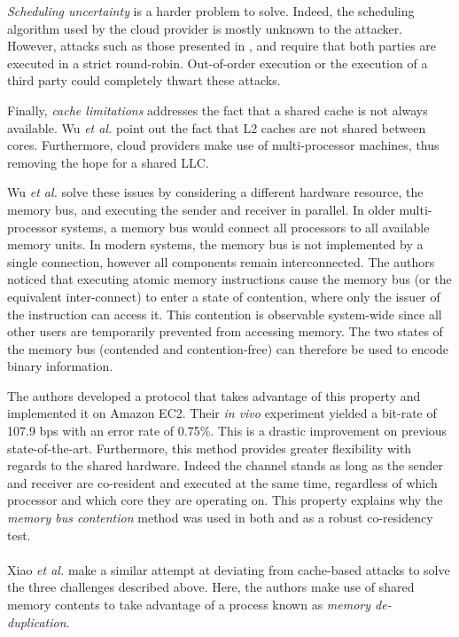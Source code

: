 \documentclass[orivec,envcountsame, a4paper, 11pt]{llncs}
\begin{document}
\textit{Scheduling uncertainty} is a harder problem to solve. Indeed, the scheduling algorithm used by the cloud provider is mostly unknown to the attacker. However, attacks such as those presented in \cite{Ristenpart2009}, \cite{Xu2011} and \cite{Zhang2012} require that both parties are executed in a strict round-robin. Out-of-order execution or the execution of a third party could completely thwart these attacks.

Finally, \textit{cache limitations} addresses the fact that a shared cache is not always available. Wu \textit{et al.} \cite{Wu2012} point out the fact that L2 caches are not shared between cores. Furthermore, cloud providers make use of multi-processor machines, thus removing the hope for a shared LLC.

Wu \textit{et al.} \cite{Wu2012} solve these issues by considering a different hardware resource, the memory bus, and executing the sender and receiver in parallel. In older multi-processor systems, a memory bus would connect all processors to all available memory units. In modern systems, the memory bus is not implemented by a single connection, however all components remain interconnected. The authors noticed that executing atomic memory instructions cause the memory bus (or the equivalent inter-connect) to enter a state of contention, where only the issuer of the instruction can access it. This contention is observable system-wide since all other users are temporarily prevented from accessing memory. The two states of the memory bus (contended and contention-free) can therefore be used to encode binary information.

The authors developed a protocol that takes advantage of this property and implemented it on Amazon EC2. Their \textit{in vivo} experiment yielded a bit-rate of 107.9 bps with an error rate of 0.75\%. This is a drastic improvement on previous state-of-the-art. Furthermore, this method provides greater flexibility with regards to the shared hardware. Indeed the channel stands as long as the sender and receiver are co-resident and executed at the same time, regardless of which processor and which core they are operating on. This property explains why the \textit{memory bus contention} method was used in both \cite{Varadarajan2015} and \cite{Xu2015} as a robust co-residency test.

\paragraph{} Xiao \textit{et al.} \cite{Xiao2013} make a similar attempt at deviating from cache-based attacks to solve the three challenges described above. Here, the authors make use of shared memory contents to take advantage of a process known as \textit{memory de-duplication}.
\end{document}
